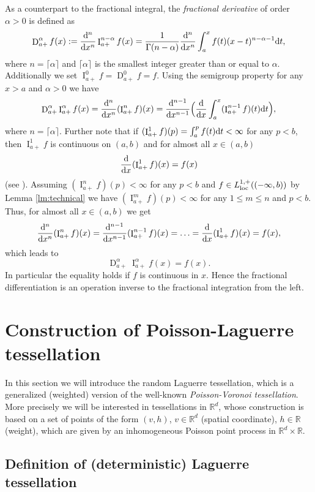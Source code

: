 \documentclass[11pt,a4paper]{article}
\theoremstyle{plain}
\theoremstyle{definition}
\theoremstyle{remark}
\def\RR{\mathbb{R}}
\newcommand{\dd}{{\rm d}}
\newcommand{\frI}{\mathop{\mathrm{I}}\nolimits}
\newcommand{\frD}{\mathop{\mathrm{D}}\nolimits}
\begin{document}
 As a counterpart to the fractional integral, the \textit{fractional derivative} of order $\alpha > 0$ is defined as
\[
    \frD_{a+}^\alpha f(x) := \frac{\dd^n}{\dd x^n} \frI_{a+}^{n-\alpha}f(x)=\frac{1}{\Gamma(n-\alpha)}\frac{\dd^n}{\dd x^n} \int_a^x f(t) (x-t)^{n-\alpha-1} \dd t,
\]
where $n=\lceil\alpha\rceil$ and $\lceil\alpha\rceil$ is the smallest integer greater than or equal to $\alpha$. Additionally we set $\frI_{a+}^0f=\frD_{a+}^0f=f$. Using the semigroup property for any $x>a$ and $\alpha>0$ we have
\[
    \frD_{a+}^\alpha \frI_{a+}^\alpha f (x)={\frac{\dd^n}{\dd x^n}}(\frI_{a+}^nf)(x)={\frac{\dd^{n-1}}{\dd x^{n-1}}}\Big(\frac{\dd}{\dd x}\int_{a}^{x}(\frI_{a+}^{n-1}f)(t)\dd t\Big),
\]
where $n=\lceil\alpha\rceil$. Further note that if $(\frI^1_{a+}f)(p)=\int_{a}^pf(t)\dd t<\infty$ for any $p<b$, then $\frI^1_{a+}f$ is continuous on $(a,b)$ and for almost all $x\in(a,b)$ 
\[
    \frac{\dd}{\dd x}(\frI^1_{a+}f)(x)=f(x)
\]
(see \cite[Proposition 6.3, Theorem 6.5]{Analysis}). Assuming $(\frI_{a+}^nf)(p)<\infty$ for any $p<b$ and $f\in L_{\rm loc}^{1,+}((-\infty,b))$ by Lemma \ref{lm:technical} we have $(\frI_{a+}^mf)(p)<\infty$ for any $1\leq m\leq n$ and $p<b$.
Thus, for almost all $x\in (a,b)$ we get
\[
    {\frac{\dd^n}{\dd x^n}}(\frI_{a+}^nf)(x)=\frac{\dd^{n-1}}{\dd x^{n-1}}(\frI_{a+}^{n-1}f)(x)=\ldots=\frac{\dd}{\dd x}(\frI^1_{a+}f)(x)=f(x),
\]
which leads to 
\begin{equation}\label{eq:DiffIntInverse}
     \frD_{a+}^\alpha \frI_{a+}^\alpha f (x) =  f(x).
\end{equation}
In particular the equality holds if $f$ is continuous in $x$. Hence the fractional differentiation is an operation inverse to the fractional integration from the left.

\section{Construction of Poisson-Laguerre tessellation}\label{sec:Construction}

In this section we will introduce the random Laguerre tessellation, which is a generalized (weighted) version of the well-known \textit{Poisson-Voronoi tessellation}. More precisely we will be interested in tessellations in $\RR^d$, whose construction is based on a set of points of the form $(v,h)$, $v\in\RR^d$ (spatial coordinate), $h\in \RR$ (weight), which are given by an inhomogeneous Poisson point process in $\RR^d\times\RR$. 

\subsection{Definition of (deterministic) Laguerre tessellation}\label{sec:Ltessel}
\end{document}
